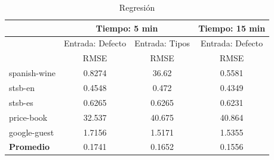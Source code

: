 \begin{table}
  \centering
  \resizebox{15cm}{!} {
  \begin{tabular}{|l|ccc|}
  \hline
  & \multicolumn{2}{p{8cm}|}{Tiempo: 5 min}  & \multicolumn{1}{p{4cm}|}{Tiempo: 15 min}\\  \hline
  & \multicolumn{1}{p{4cm}|}{Entrada: Defecto} & \multicolumn{1}{p{4cm}|}{Entrada: Tipos} & \multicolumn{1}{p{4cm}|}{Entrada: Defecto}\\ \hline
               & RMSE  & RMSE  & RMSE  \\ \hline
  spanish-wine & 0.8274  & 36.62  & 0.5581 \\
  stsb-en      & 0.4548  & 0.472  & 0.4349 \\
  stsb-es      & 0.6265  & 0.6265 & 0.6231   \\ 
  price-book   & 32.537  & 40.675 & 40.864  \\
  google-guest & 1.7156  & 1.5171 & 1.5355  \\ \hline
  \textbf{Promedio} & 0.1741 & 0.1652 & 0.1556 \\ \hline

\end{tabular}
  \caption{Regresión}
  \label{fig:regression}
  }
\end{table}


 

